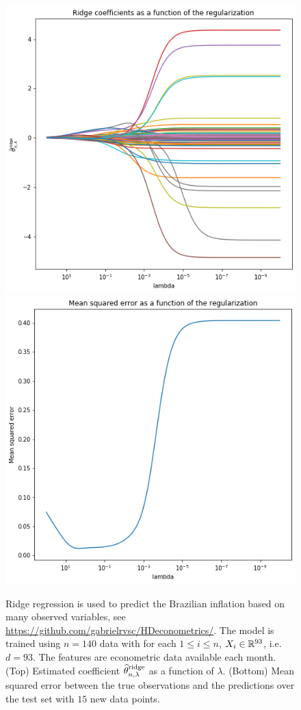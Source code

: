 \begin{figure}
\begin{center}
\includegraphics[width = .7\linewidth]{./Illustrations/ridge_coef.png}
\includegraphics[width = .7\linewidth]{./Illustrations/ridge_rmse_test.png}
\end{center}
\caption{Ridge regression is used to predict the Brazilian inflation based on many observed variables, see \url{https://github.com/gabrielrvsc/HDeconometrics/}. The model is trained using $n=140$ data with for each $1\leqslant i \leqslant n$, $X_i\in\mathbb{R}^{93}$, i.e. $d  =93$. The features are econometric data available each month. (Top) Estimated coefficient $\widehat {\theta}^{\mathrm{ridge}}_{n,\lambda}$ as a function of $\lambda$. (Bottom) Mean squared error between the true observations and the predictions over the test set with $15$ new data points.}
\end{figure}


